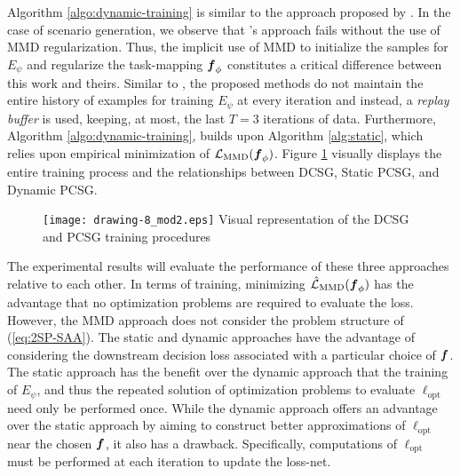 Algorithm \ref{algo:dynamic-training} is similar to the approach proposed by \citet{zharmagambetov2023landscape}. In the case of scenario generation, we observe that \citet{zharmagambetov2023landscape}'s approach fails without the use of MMD regularization. Thus, the implicit use of MMD to initialize the samples for $E_{\psi}$ and regularize the task-mapping $\boldsymbol{f}_{\phi}$ constitutes a critical difference between this work and theirs. Similar to \citet{zharmagambetov2023landscape}, the proposed methods do not maintain the entire history of examples for training $E_{\psi}$ at every iteration and instead, a \textit{replay buffer} \citep{lin1992self} is used, keeping, at most, the last $T = 3$ iterations of data. Furthermore, Algorithm \ref{algo:dynamic-training}, builds upon Algorithm \ref{alg:static}, which relies upon empirical minimization of $\mathcal{L}_{\text{MMD}}(\boldsymbol{f}_{\phi})$. Figure \ref{fig:overall training} visually displays the entire training process and the relationships between DCSG, Static PCSG, and Dynamic PCSG. 
\begin{figure}[h]
  \FIGURE
  { \texttt{[image: drawing-8\_mod2.eps]} }
  {Visual representation of the DCSG and PCSG training procedures \label{fig:overall training}}
  {}
\end{figure}

The experimental results will evaluate the performance of these three approaches relative to each other. In terms of training, minimizing $\hat{\mathcal{L}}_{\text{MMD}}(\boldsymbol{f}_{\phi})$ has the advantage that no optimization problems are required to evaluate the loss. However, the MMD approach does not consider the problem structure of (\ref{eq:2SP-SAA}). The static and dynamic approaches have the advantage of considering the downstream decision loss associated with a particular choice of $\boldsymbol{f}$. The static approach has the benefit over the dynamic approach that the training of $E_{\psi}$, and thus the repeated solution of optimization problems to evaluate $\ell_{\text{opt}}$ need only be performed once. While the dynamic approach offers an advantage over the static approach by aiming to construct better approximations of $\ell_{\text{opt}}$ near the chosen $\boldsymbol{f}$, it also has a drawback. Specifically, computations of $\ell_{\text{opt}}$ must be performed at each iteration to update the loss-net.
